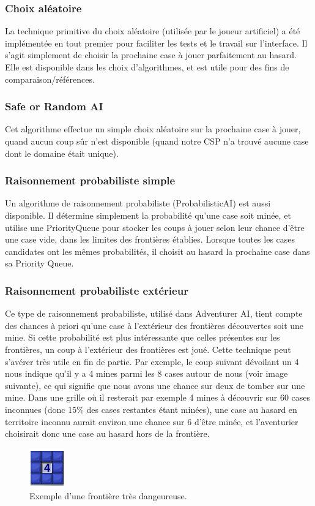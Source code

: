 \documentclass{article}
\begin{document}
\subsubsection{Choix aléatoire}
La technique primitive du choix aléatoire (utilisée par le joueur artificiel) a été implémentée 
en tout premier pour faciliter les tests et le travail sur l’interface. 
Il s’agit simplement de choisir la prochaine case à jouer parfaitement au hasard. 
Elle est disponible dans les choix d’algorithmes, et est utile pour des fins de comparaison/références.

\subsubsection{Safe or Random AI}
Cet algorithme effectue un simple choix 
aléatoire sur la prochaine case à jouer, quand aucun coup sûr n’est disponible 
(quand notre CSP n’a trouvé aucune case dont le domaine était unique).

\subsubsection{Raisonnement probabiliste simple}
Un algorithme de raisonnement probabiliste (ProbabilisticAI) est aussi disponible. 
Il détermine simplement la probabilité qu’une case soit minée, et utilise une 
PriorityQueue pour stocker les coups à jouer selon leur chance d’être une 
case vide, dans les limites des frontières établies. Lorsque toutes 
les cases candidates ont les mêmes probabilités, il choisit au hasard la prochaine case dans sa Priority Queue.

\subsubsection{Raisonnement probabiliste extérieur}
Ce type de raisonnement probabiliste, utilisé dans Adventurer AI, tient compte des chances à priori qu’une case 
à l'extérieur des frontières découvertes soit une mine. Si cette probabilité est plus intéressante que celles présentes
sur les frontières, un coup à l'extérieur des frontières est joué. Cette technique peut s'avérer très utile en fin de partie.
Par exemple, le coup suivant dévoilant un 4 nous indique qu’il y a 4 mines parmi 
les 8 cases autour de nous (voir image suivante), ce qui signifie que nous avons une chance sur deux de 
tomber sur une mine. Dans une grille où il resterait par exemple 4 mines à découvrir 
sur 60 cases inconnues (donc 15\% des cases restantes étant minées), une case au 
hasard en territoire inconnu aurait environ une chance sur 6 d’être minée, et 
l’aventurier choisirait donc une case au hasard hors de la frontière. 
\begin{figure}[h!]
\caption {Exemple d'une frontière très dangeureuse.}
\centering
\includegraphics[scale=.5]{./demineur_3.png}
\end{figure}
\end{document}
